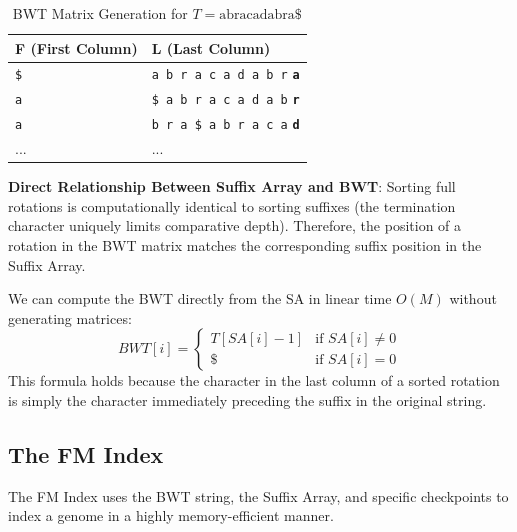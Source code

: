 \documentclass[11pt,a4paper]{article}
\begin{document}
\begin{table}[h]
\centering
\caption{BWT Matrix Generation for $T = \text{abracadabra\$}$}
\label{tab:bwt}
\begin{tabularx}{0.7\textwidth}{l X}
\toprule
\textbf{F (First Column)} & \textbf{L (Last Column)} \\
\midrule
\texttt{\$} & \texttt{a b r a c a d a b r} \textbf{\texttt{a}} \\
\texttt{a} & \texttt{\$ a b r a c a d a b} \textbf{\texttt{r}} \\
\texttt{a} & \texttt{b r a \$ a b r a c a} \textbf{\texttt{d}} \\
... & ... \\
\bottomrule
\end{tabularx}
\end{table}

\textbf{Direct Relationship Between Suffix Array and BWT}:
Sorting full rotations is computationally identical to sorting suffixes (the termination character uniquely limits comparative depth). Therefore, the position of a rotation in the BWT matrix matches the corresponding suffix position in the Suffix Array. 

We can compute the BWT directly from the SA in linear time $O(M)$ without generating matrices:
\begin{equation}
BWT[i] = 
\begin{cases} 
T[SA[i] - 1] & \text{if } SA[i] \neq 0 \\
\texttt{\$} & \text{if } SA[i] = 0 
\end{cases}
\end{equation}
This formula holds because the character in the last column of a sorted rotation is simply the character immediately preceding the suffix in the original string.

\subsection{The FM Index}
The FM Index uses the BWT string, the Suffix Array, and specific checkpoints to index a genome in a highly memory-efficient manner.
\end{document}

